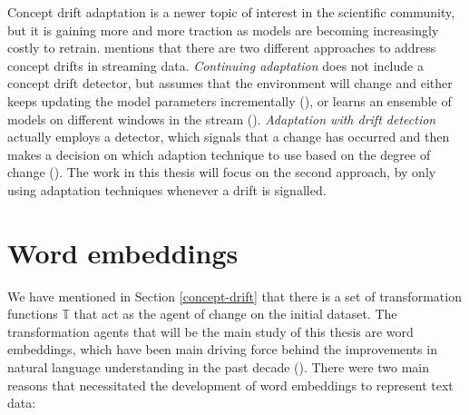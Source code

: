 \documentclass[12pt]{extreport}
\begin{document}
Concept drift adaptation is a newer topic of interest in the scientific community, but it is gaining more and more traction as models are becoming increasingly costly to retrain. \cite{hht} mentions that there are two different approaches to address concept drifts in streaming data. \emph{Continuing adaptation} does not include a concept drift detector, but assumes that the environment will change and either keeps updating the model parameters incrementally (\cite{adwin}), or learns an ensemble of models on different windows in the stream (\cite{incremental-learning-of-concept-drift}). \emph{Adaptation with drift detection} actually employs a detector, which signals that a change has occurred and then makes a decision on which adaption technique to use based on the degree of change (\cite{concept-drift-detection-for-streaming-data}). The work in this thesis will focus on the second approach, by only using adaptation techniques whenever a drift is signalled.

\section{Word embeddings} \label{sec:word-embeddings}

We have mentioned in Section \ref{concept-drift} that there is a set of transformation functions $\mathbb{T}$ that act as the agent of change on the initial dataset. The transformation agents that will be the main study of this thesis are word embeddings, which have been main driving force behind the improvements in natural language understanding in the past decade (\cite{word-embedding-survey}). There were two main reasons that necessitated the development of word embeddings to represent text data:
\end{document}
